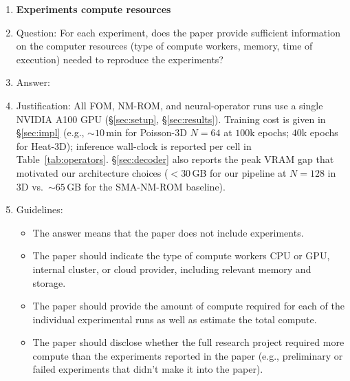 \begin{enumerate}
\item {\bf Experiments compute resources}
    \item[] Question: For each experiment, does the paper provide sufficient information on the computer resources (type of compute workers, memory, time of execution) needed to reproduce the experiments?
    \item[] Answer: \answerYes{}
    \item[] Justification: All FOM, NM-ROM, and neural-operator runs use a single NVIDIA A100 GPU (\S\ref{sec:setup}, \S\ref{sec:results}). Training cost is given in \S\ref{sec:impl} (e.g., $\sim 10$\,min for Poisson-3D $N=64$ at $100$k epochs; $40$k epochs for Heat-3D); inference wall-clock is reported per cell in Table~\ref{tab:operators}. \S\ref{sec:decoder} also reports the peak VRAM gap that motivated our architecture choices ($<30$\,GB for our pipeline at $N{=}128$ in 3D vs.\ $\sim 65$\,GB for the SMA-NM-ROM baseline).
    \item[] Guidelines:
    \begin{itemize}
        \item The answer \answerNA{} means that the paper does not include experiments.
        \item The paper should indicate the type of compute workers CPU or GPU, internal cluster, or cloud provider, including relevant memory and storage.
        \item The paper should provide the amount of compute required for each of the individual experimental runs as well as estimate the total compute. 
        \item The paper should disclose whether the full research project required more compute than the experiments reported in the paper (e.g., preliminary or failed experiments that didn't make it into the paper). 
    \end{itemize}
    

\end{enumerate}

